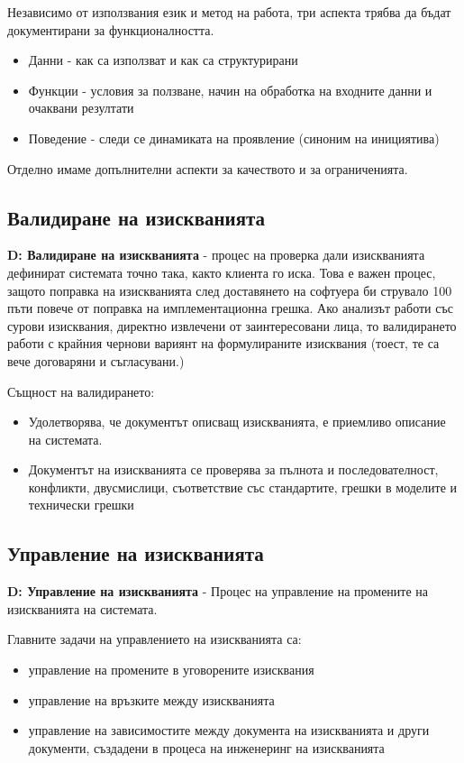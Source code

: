 \documentclass[fleqn,12pt]{article}
\begin{document}
Независимо от използвания език и метод на работа, три аспекта трябва да бъдат документирани за функционалността.
\begin{itemize}
	\item Данни - как са използват и как са структурирани
	\item Функции - условия за ползване, начин на обработка на входните данни и очаквани резултати
	\item Поведение - следи се динамиката на проявление (синоним на инициятива)
\end{itemize}

Отделно имаме допълнителни аспекти за качеството и за ограниченията.

\subsection{Валидиране на изискванията}
\textbf{D: Валидиране на изискванията} - процес на проверка дали изискванията дефинират системата точно така, както клиента го иска. Това е важен процес, защото поправка на изискванията след доставянето на софтуера би струвало 100 пъти повече от поправка на имплементационна грешка.
\bigbreak
Ако анализът работи със сурови изисквания, директно извлечени от заинтересовани лица, то валидирането работи с крайния чернови вариянт на формулираните изисквания (тоест, те са вече договаряни и съгласувани.)

Същност на валидирането:
\begin{itemize}
	\item Удолетворява, че документът описващ изискванията, е приемливо описание на системата.
	\item Документът на изискванията се проверява за пълнота и последователност, конфликти, двусмислици, съответствие със стандартите, грешки в моделите и технически грешки
\end{itemize}

\subsection{Управление на изискванията}
\textbf{D: Управление на изискванията} - Процес на управление на промените на изискванията на системата.

Главните задачи на управлението на изискванията са:
\begin{itemize}
	\item управление на промените в уговорените изисквания
	\item управление на връзките между изискванията
	\item управление на зависимостите между документа на изискванията и други документи, създадени в процеса на инженеринг на изискванията
\end{itemize}
\end{document}

